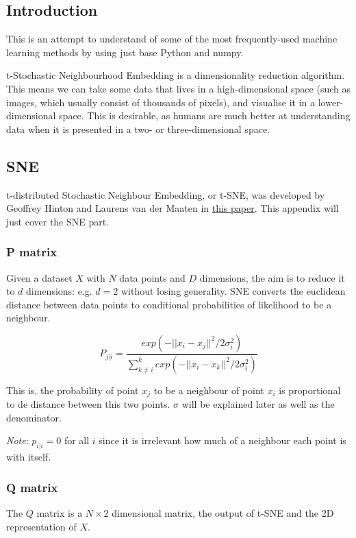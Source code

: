 \subsection{Introduction}
This is an attempt to understand of some of the most frequently-used machine learning methods by using just base Python and numpy.

t-Stochastic Neighbourhood Embedding is a dimensionality reduction algorithm. This means we can take some data that lives in a high-dimensional space (such as images, which usually consist of thousands of pixels), and visualise it in a lower-dimensional space. This is desirable, as humans are much better at understanding data when it is presented in a two- or three-dimensional space.

\subsection{SNE}
t-distributed Stochastic Neighbour Embedding, or t-SNE, was developed by Geoffrey Hinton and Laurens van der Maaten in \hyperlink{http://www.jmlr.org/papers/volume9/vandermaaten08a/vandermaaten08a.pdf}{this paper}. This appendix will just cover the SNE part.

\subsubsection{P matrix}

Given a dataset $X$ with $N$ data points and $D$ dimensions, the aim is to reduce it to $d$ dimensions: e.g. $d=2$ without losing generality. SNE converts the euclidean distance between data points to conditional probabilities of likelihood to be a neighbour.

$$ P_{j|i}=\frac{exp(-||x_i - x_j||^2 / 2\sigma^2_i)}{\sum_{k\neq i}^kexp(-||x_i - x_k||^2 / 2\sigma^2_i)} $$

This is, the probability of point $x_j$ to be a neighbour of point $x_i$ is proportional to de distance between this two points. $\sigma$ will be explained later as well as the denominator.

\emph{Note}: $p_{i|i}=0$ for all $i$ since it is irrelevant how much of a neighbour each point is with itself.

\subsubsection{Q matrix}
The $Q$ matrix is a $N\times2$ dimensional matrix, the output of t-SNE and the 2D representation of $X$.

